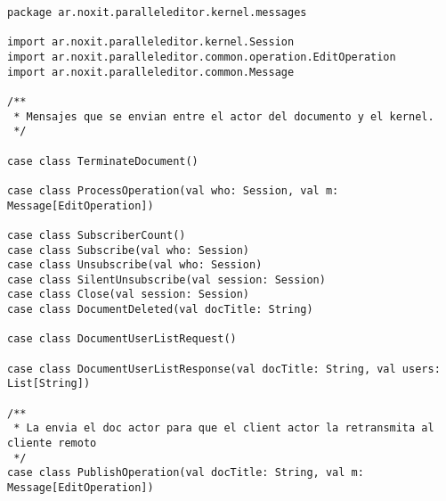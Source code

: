 {
\tiny
\begin{verbatim}
package ar.noxit.paralleleditor.kernel.messages

import ar.noxit.paralleleditor.kernel.Session
import ar.noxit.paralleleditor.common.operation.EditOperation
import ar.noxit.paralleleditor.common.Message

/**
 * Mensajes que se envian entre el actor del documento y el kernel.
 */

case class TerminateDocument()

case class ProcessOperation(val who: Session, val m: Message[EditOperation])

case class SubscriberCount()
case class Subscribe(val who: Session)
case class Unsubscribe(val who: Session)
case class SilentUnsubscribe(val session: Session)
case class Close(val session: Session)
case class DocumentDeleted(val docTitle: String)

case class DocumentUserListRequest()

case class DocumentUserListResponse(val docTitle: String, val users: List[String])

/**
 * La envia el doc actor para que el client actor la retransmita al cliente remoto
 */
case class PublishOperation(val docTitle: String, val m: Message[EditOperation])
\end{verbatim}
}